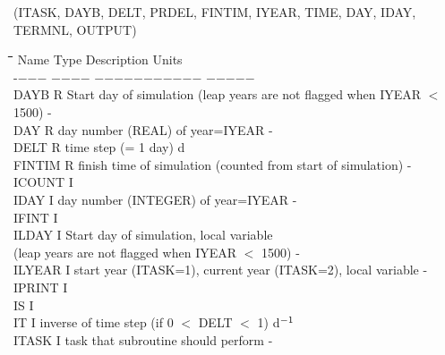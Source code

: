 \documentclass[11pt]{article}
\begin{document}
\begin{indenting}{3.81cm}
(ITASK, DAYB, DELT, PRDEL, FINTIM, IYEAR, TIME, DAY, IDAY, TERMNL, OUTPUT)
\end{indenting}
\nwln
\begin{tabbing}
\hspace{1.27cm}\=\hspace{1.27cm}\=\hspace{1.27cm}\=\hspace{1.27cm}\=%
\hspace{1.27cm}\=\hspace{1.27cm}\=\hspace{1.27cm}\=\hspace{1.27cm}\=%
\hspace{1.27cm}\=\hspace{1.27cm}\=\kill
Name    \> \> Type   \> Description                                        \> \> \> \> \> \> \> Units\\
-$-$$-$$-$    \> \> $-$$-$$-$$-$   \> $-$$-$$-$$-$$-$$-$$-$$-$$-$$-$$-$                                        \> \> \> \> \> \> \> $-$$-$$-$$-$$-$\\
DAYB\> \> R\> Start day of simulation (leap years are not flagged when IYEAR $<$ 1500)\> \> \> \> \> \> \> -\\
DAY\> \> R\> day number (REAL) of year=IYEAR\> \> \> \> \> \> \> -\\
DELT\> \> R\> time step (= 1 day)\> \> \> \> \> \> \> d\\
FINTIM\> \> R\> finish time of simulation (counted from start of simulation)\> \> \> \> \> \> \> -\\
ICOUNT\> \> I\\
IDAY\> \> I\> day number (INTEGER) of year=IYEAR\> \> \> \> \> \> \> -\\
IFINT\> \> I\\
ILDAY\> \> I\> Start day of simulation, local variable\\
\>\> \> (leap years are not flagged when IYEAR $<$ 1500)\> \> \> \> \> \> \> -\\
ILYEAR\> \> I\> start year (ITASK=1), current year (ITASK=2), local variable\> \> \> \> \> \> \> -\\
IPRINT\> \> I\\
IS\> \> I\\
IT\> \> I\> inverse of time step (if 0 $<$ DELT $<$ 1)\> \> \> \> \> \> \> d$^{{\rm -1}}$\\
ITASK\> \> I\> task that subroutine should perform\> \> \> \> \> \> \> -\\
$$
\end{tabbing}
\end{document}
